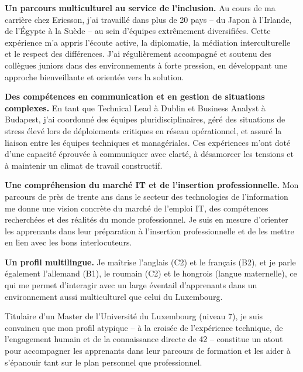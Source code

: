 \documentclass[a4paper,11pt]{article}
\begin{document}
\vspace{0.3cm}

\noindent \textbf{Un parcours multiculturel au service de l'inclusion.} Au cours de ma carrière chez Ericsson, j'ai travaillé dans plus de 20 pays -- du Japon à l'Irlande, de l'Égypte à la Suède -- au sein d'équipes extrêmement diversifiées. Cette expérience m'a appris l'écoute active, la diplomatie, la médiation interculturelle et le respect des différences. J'ai régulièrement accompagné et soutenu des collègues juniors dans des environnements à forte pression, en développant une approche bienveillante et orientée vers la solution.

\vspace{0.3cm}

\noindent \textbf{Des compétences en communication et en gestion de situations complexes.} En tant que Technical Lead à Dublin et Business Analyst à Budapest, j'ai coordonné des équipes pluridisciplinaires, géré des situations de stress élevé lors de déploiements critiques en réseau opérationnel, et assuré la liaison entre les équipes techniques et managériales. Ces expériences m'ont doté d'une capacité éprouvée à communiquer avec clarté, à désamorcer les tensions et à maintenir un climat de travail constructif.

\vspace{0.3cm}

\noindent \textbf{Une compréhension du marché IT et de l'insertion professionnelle.} Mon parcours de près de trente ans dans le secteur des technologies de l'information me donne une vision concrète du marché de l'emploi IT, des compétences recherchées et des réalités du monde professionnel. Je suis en mesure d'orienter les apprenants dans leur préparation à l'insertion professionnelle et de les mettre en lien avec les bons interlocuteurs.

\vspace{0.3cm}

\noindent \textbf{Un profil multilingue.} Je maîtrise l'anglais (C2) et le français (B2), et je parle également l'allemand (B1), le roumain (C2) et le hongrois (langue maternelle), ce qui me permet d'interagir avec un large éventail d'apprenants dans un environnement aussi multiculturel que celui du Luxembourg.

\vspace{0.3cm}

\noindent Titulaire d'un Master de l'Université du Luxembourg (niveau 7), je suis convaincu que mon profil atypique -- à la croisée de l'expérience technique, de l'engagement humain et de la connaissance directe de 42 -- constitue un atout pour accompagner les apprenants dans leur parcours de formation et les aider à s'épanouir tant sur le plan personnel que professionnel.
\end{document}

